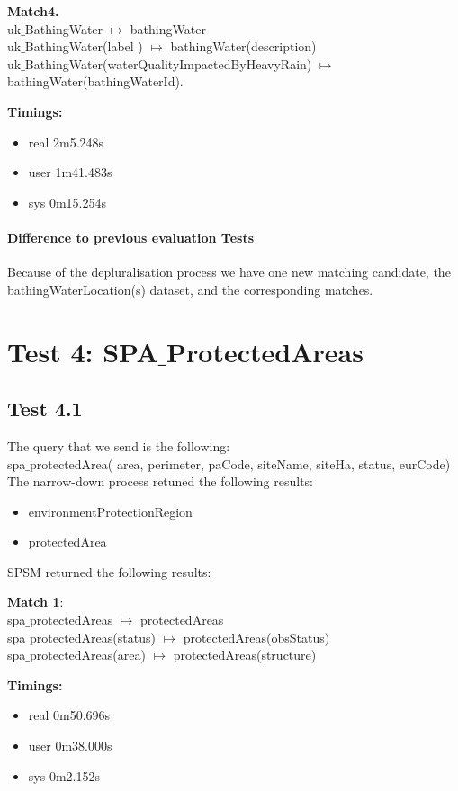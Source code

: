 \documentclass[a4paper,10pt]{article}
\begin{document}
\textbf{Match4. }\\
uk$\_$BathingWater  $\mapsto$ bathingWater\\
uk$\_$BathingWater(label ) $\mapsto$  bathingWater(description)\\
uk$\_$BathingWater(waterQualityImpactedByHeavyRain) $\mapsto$  bathingWater(bathingWaterId).


\textbf{Timings:}
\begin{itemize}
\item real	2m5.248s
\item user	1m41.483s
\item sys	0m15.254s

\end{itemize}


\paragraph{Difference to previous evaluation Tests}
Because of the depluralisation process we have one new matching candidate,  the bathingWaterLocation(s)  dataset, and the corresponding matches. 



\section{Test 4: SPA$\_$ProtectedAreas}
\subsection{Test 4.1} The query that we send is the following:\\
spa$\_$protectedArea( area, perimeter, paCode, siteName, siteHa, status, eurCode)\\
The narrow-down process retuned the following results:
\begin{itemize}
\item environmentProtectionRegion
\item protectedArea
\end{itemize}
 SPSM returned the following results: 
 
 \textbf{Match 1}: \\
spa$\_$protectedAreas $\mapsto$ protectedAreas \\
spa$\_$protectedAreas(status) $\mapsto$ protectedAreas(obsStatus)\\
spa$\_$protectedAreas(area) $\mapsto$ protectedAreas(structure)
 
 
\textbf{Timings: }
\begin{itemize}
\item real	0m50.696s
\item user	0m38.000s
\item sys	0m2.152s

\end{itemize}
\end{document}
